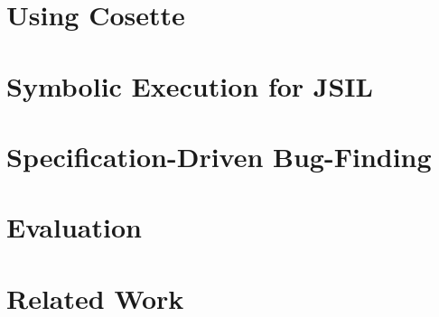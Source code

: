 \documentclass[sigconf, review]{acmart}
\newcommand{\jsil}{JSIL\xspace}
\newcommand{\polish}[1]{{\color{red}#1}}
\newcommand{\cosette}{Cosette\xspace}
\newcommand{\myparagraph}[1]{\smallskip\noindent {\bf #1.}\hspace{1pt}}
\begin{document}
%
%
%
%




\section{Using \cosette}\label{sec:overview}


\section{Symbolic Execution for \jsil}\label{sec:jsil:symb:exec}


\section{Specification-Driven Bug-Finding}\label{sec:specs}


%

\section{Evaluation}\label{sec:evaluation}


\section{Related Work}
\label{sec:rwc} 
\end{document}
